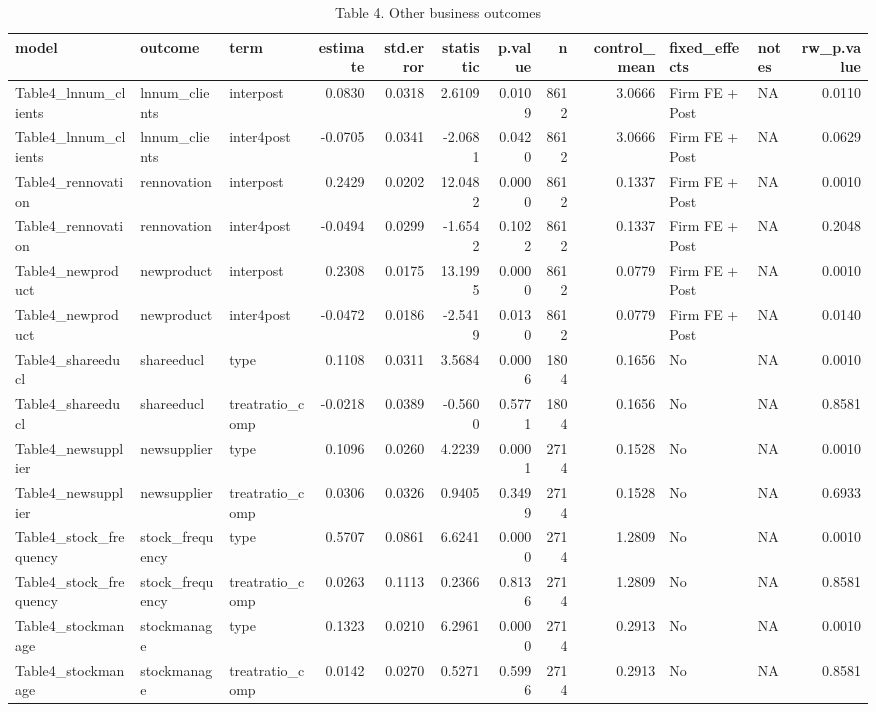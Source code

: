 \begin{table}

\caption{Table 4. Other business outcomes}
\centering
\begin{tabular}[t]{lllrrrrrrllr}
\toprule
model & outcome & term & estimate & std.error & statistic & p.value & n & control\_mean & fixed\_effects & notes & rw\_p.value\\
\midrule
Table4\_lnnum\_clients & lnnum\_clients & interpost & 0.0830 & 0.0318 & 2.6109 & 0.0109 & 8612 & 3.0666 & Firm FE + Post & NA & 0.0110\\
Table4\_lnnum\_clients & lnnum\_clients & inter4post & -0.0705 & 0.0341 & -2.0681 & 0.0420 & 8612 & 3.0666 & Firm FE + Post & NA & 0.0629\\
Table4\_rennovation & rennovation & interpost & 0.2429 & 0.0202 & 12.0482 & 0.0000 & 8612 & 0.1337 & Firm FE + Post & NA & 0.0010\\
Table4\_rennovation & rennovation & inter4post & -0.0494 & 0.0299 & -1.6542 & 0.1022 & 8612 & 0.1337 & Firm FE + Post & NA & 0.2048\\
Table4\_newproduct & newproduct & interpost & 0.2308 & 0.0175 & 13.1995 & 0.0000 & 8612 & 0.0779 & Firm FE + Post & NA & 0.0010\\
\addlinespace
Table4\_newproduct & newproduct & inter4post & -0.0472 & 0.0186 & -2.5419 & 0.0130 & 8612 & 0.0779 & Firm FE + Post & NA & 0.0140\\
Table4\_shareeducl & shareeducl & type & 0.1108 & 0.0311 & 3.5684 & 0.0006 & 1804 & 0.1656 & No & NA & 0.0010\\
Table4\_shareeducl & shareeducl & treatratio\_comp & -0.0218 & 0.0389 & -0.5600 & 0.5771 & 1804 & 0.1656 & No & NA & 0.8581\\
Table4\_newsupplier & newsupplier & type & 0.1096 & 0.0260 & 4.2239 & 0.0001 & 2714 & 0.1528 & No & NA & 0.0010\\
Table4\_newsupplier & newsupplier & treatratio\_comp & 0.0306 & 0.0326 & 0.9405 & 0.3499 & 2714 & 0.1528 & No & NA & 0.6933\\
\addlinespace
Table4\_stock\_frequency & stock\_frequency & type & 0.5707 & 0.0861 & 6.6241 & 0.0000 & 2714 & 1.2809 & No & NA & 0.0010\\
Table4\_stock\_frequency & stock\_frequency & treatratio\_comp & 0.0263 & 0.1113 & 0.2366 & 0.8136 & 2714 & 1.2809 & No & NA & 0.8581\\
Table4\_stockmanage & stockmanage & type & 0.1323 & 0.0210 & 6.2961 & 0.0000 & 2714 & 0.2913 & No & NA & 0.0010\\
Table4\_stockmanage & stockmanage & treatratio\_comp & 0.0142 & 0.0270 & 0.5271 & 0.5996 & 2714 & 0.2913 & No & NA & 0.8581\\
\bottomrule
\end{tabular}
\end{table}
